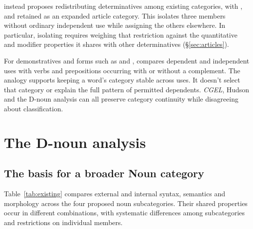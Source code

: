 \documentclass[12pt]{article}
\begin{document}
\textcite{spinillo2004reconceptualising} instead proposes redistributing determinatives among existing categories, with ,  and  retained as an expanded article category. This isolates three members without ordinary independent use while assigning the others elsewhere. In particular, isolating  requires weighing that restriction against the quantitative and modifier properties it shares with other determinatives (§\ref{sec:articles}).

For demonstratives and forms such as  and , \textcite[140--144]{spinillo2004reconceptualising} compares dependent and independent uses with verbs and prepositions occurring with or without a complement. The analogy supports keeping a word's category stable across uses. It doesn't select that category or explain the full pattern of permitted dependents. \textit{CGEL}, Hudson and the D-noun analysis can all preserve category continuity while disagreeing about classification.

\section{The D-noun analysis}\label{sec:proposal}

\subsection{The basis for a broader Noun category}\label{sec:membership}

Table~\ref{tab:existing} compares external and internal syntax, semantics and morphology across the four proposed noun subcategories. Their shared properties occur in different combinations, with systematic differences among subcategories and restrictions on individual members.
\end{document}

